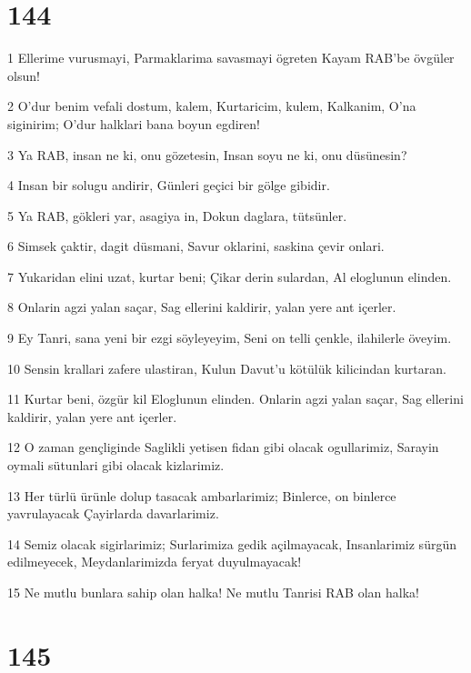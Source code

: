 \chapter{144}

\par 1 Ellerime vurusmayi, Parmaklarima savasmayi ögreten Kayam RAB'be övgüler olsun!
\par 2 O'dur benim vefali dostum, kalem, Kurtaricim, kulem, Kalkanim, O'na siginirim; O'dur halklari bana boyun egdiren!
\par 3 Ya RAB, insan ne ki, onu gözetesin, Insan soyu ne ki, onu düsünesin?
\par 4 Insan bir solugu andirir, Günleri geçici bir gölge gibidir.
\par 5 Ya RAB, gökleri yar, asagiya in, Dokun daglara, tütsünler.
\par 6 Simsek çaktir, dagit düsmani, Savur oklarini, saskina çevir onlari.
\par 7 Yukaridan elini uzat, kurtar beni; Çikar derin sulardan, Al eloglunun elinden.
\par 8 Onlarin agzi yalan saçar, Sag ellerini kaldirir, yalan yere ant içerler.
\par 9 Ey Tanri, sana yeni bir ezgi söyleyeyim, Seni on telli çenkle, ilahilerle öveyim.
\par 10 Sensin krallari zafere ulastiran, Kulun Davut'u kötülük kilicindan kurtaran.
\par 11 Kurtar beni, özgür kil Eloglunun elinden. Onlarin agzi yalan saçar, Sag ellerini kaldirir, yalan yere ant içerler.
\par 12 O zaman gençliginde Saglikli yetisen fidan gibi olacak ogullarimiz, Sarayin oymali sütunlari gibi olacak kizlarimiz.
\par 13 Her türlü ürünle dolup tasacak ambarlarimiz; Binlerce, on binlerce yavrulayacak Çayirlarda davarlarimiz.
\par 14 Semiz olacak sigirlarimiz; Surlarimiza gedik açilmayacak, Insanlarimiz sürgün edilmeyecek, Meydanlarimizda feryat duyulmayacak!
\par 15 Ne mutlu bunlara sahip olan halka! Ne mutlu Tanrisi RAB olan halka!

\chapter{145}

